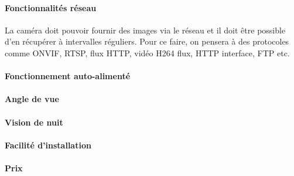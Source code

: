 \paragraph{Fonctionnalités réseau}
La caméra doit pouvoir fournir des images via le réseau et il doit être possible d'en récupérer à intervalles réguliers. Pour ce faire, on pensera à des protocoles comme ONVIF, RTSP, flux HTTP, vidéo H264 flux, HTTP interface, FTP etc.


\paragraph{Fonctionnement auto-alimenté}

\paragraph{Angle de vue}
\paragraph{Vision de nuit}
\paragraph{Facilité d'installation}

\paragraph{Prix}
